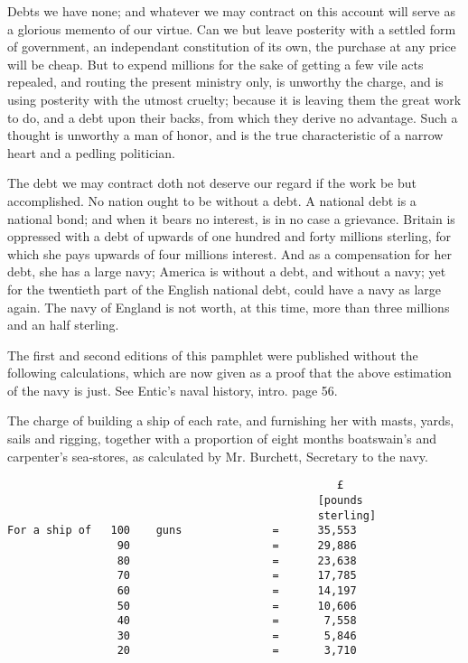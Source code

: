 \documentclass[12pt,oneside]{memoir}
\begin{document}
Debts we have none; and whatever we may contract on this account will serve as a glorious memento of our virtue. Can we but leave posterity with a settled form of government, an independant constitution of its own, the purchase at any price will be cheap. But to expend millions for the sake of getting a few vile acts repealed, and routing the present ministry only, is unworthy the charge, and is using posterity with the utmost cruelty; because it is leaving them the great work to do, and a debt upon their backs, from which they derive no advantage. Such a thought is unworthy a man of honor, and is the true characteristic of a narrow heart and a pedling politician.

The debt we may contract doth not deserve our regard if the work be but accomplished. No nation ought to be without a debt. A national debt is a national bond; and when it bears no interest, is in no case a grievance. Britain is oppressed with a debt of upwards of one hundred and forty millions sterling, for which she pays upwards of four millions interest. And as a compensation for her debt, she has a large navy; America is without a debt, and without a navy; yet for the twentieth part of the English national debt, could have a navy as large again. The navy of England is not worth, at this time, more than three millions and an half sterling.

The first and second editions of this pamphlet were published without the following calculations, which are now given as a proof that the above estimation of the navy is just. See Entic's naval history, intro. page 56.

The charge of building a ship of each rate, and furnishing her with masts, yards, sails and rigging, together with a proportion of eight months boatswain's and carpenter's sea-stores, as calculated by Mr. Burchett, Secretary to the navy.

\begin{verbatim}
                                                   £
                                                [pounds
                                                sterling]
For a ship of   100    guns              =      35,553
                 90                      =      29,886
                 80                      =      23,638
                 70                      =      17,785
                 60                      =      14,197
                 50                      =      10,606
                 40                      =       7,558
                 30                      =       5,846
                 20                      =       3,710
\end{verbatim}
\end{document}

